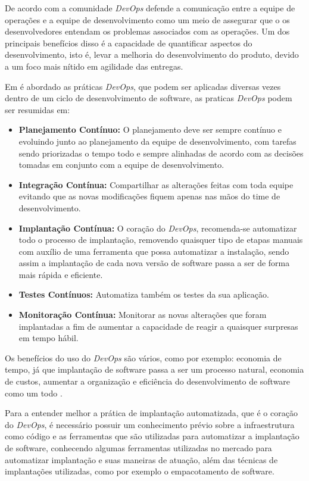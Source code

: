 De acordo com \cite{httermann2012DevOps} a comunidade \textit{DevOps} defende a comunicação
entre a equipe de operações e a equipe de desenvolvimento como um meio de assegurar
que o os desenvolvedores entendam os problemas associados com as operações. Um dos
principais benefícios disso é a capacidade de quantificar aspectos do desenvolvimento,
isto é, levar a melhoria do desenvolvimento do produto, devido a um foco mais nítido
em agilidade das entregas.

Em \cite{7173368} é abordado as práticas \textit{DevOps}, que podem ser aplicadas diversas
 vezes dentro de um ciclo de desenvolvimento de software, as praticas \textit{DevOps} podem ser resumidas em:

 \begin{itemize}
   \item \textbf{Planejamento Contínuo:} O planejamento deve ser sempre contínuo
   e evoluindo junto ao planejamento da equipe de desenvolvimento, com tarefas
   sendo priorizadas o tempo todo e sempre alinhadas de acordo com as decisões tomadas
   em conjunto com a equipe de desenvolvimento.
   \item \textbf{Integração Contínua:} Compartilhar as alterações feitas com toda equipe
   evitando que as novas modificações fiquem apenas nas mãos do time de desenvolvimento.
   \item \textbf{Implantação Contínua:} O coração do \textit{DevOps}, recomenda-se automatizar
   todo o processo de implantação, removendo quaisquer tipo de etapas manuais com auxílio
   de uma ferramenta que possa automatizar a instalação, sendo assim a implantação
   de cada nova versão de software passa a ser de forma mais rápida e eficiente.
   \item \textbf{Testes Contínuos:} Automatiza também os testes da sua aplicação.
   \item \textbf{Monitoração Contínua:} Monitorar as novas alterações
   que foram implantadas a fim de aumentar a capacidade de reagir a quaisquer surpresas
   em tempo hábil.
 \end{itemize}

 Os benefícios do uso do \textit{DevOps} são vários, como por exemplo: economia de tempo,
 já que implantação de software passa a ser um processo natural, economia de custos, aumentar
 a organização e eficiência do desenvolvimento de software como um todo \cite{7173368}.

Para a entender melhor a prática de implantação automatizada, que é o coração
do \textit{DevOps}, é necessário possuir um conhecimento prévio sobre  a infraestrutura
como código e as ferramentas que são utilizadas para
automatizar a implantação de software, conhecendo algumas ferramentas utilizadas
no mercado para automatizar implantação e suas maneiras de atuação, além das técnicas
de implantações utilizadas, como por exemplo o empacotamento de software.

